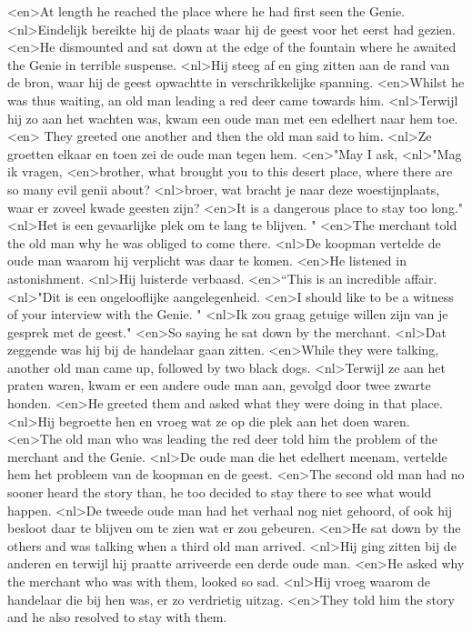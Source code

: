 <en>At length he reached the place where he had first seen the Genie.
<nl>Eindelijk bereikte hij de plaats  waar hij de geest voor het eerst had gezien.
<en>He dismounted and sat down at the edge of the fountain where he awaited the Genie in terrible suspense.
<nl>Hij steeg af en ging zitten aan de rand van de bron, waar hij de geest opwachtte in verschrikkelijke spanning.
<en>Whilst he was thus waiting, an old man leading a red deer came towards him. 
<nl>Terwijl hij zo aan het wachten was, kwam een oude man met een edelhert naar hem toe. 
<en> They greeted one another and then the old man said to him.
<nl>Ze groetten elkaar en toen zei de oude man tegen hem.
<en>"May I ask,
<nl>"Mag ik vragen,
<en>brother, what brought you to this desert place, where there are so many evil genii about?
<nl>broer, wat bracht je naar deze woestijnplaats, waar er zoveel kwade geesten zijn?
<en>It is a dangerous place to stay too long."
<nl>Het is een gevaarlijke plek om te lang te blijven. "
<en>The merchant told the old man why he was obliged to come there.
<nl>De koopman vertelde de oude man waarom hij verplicht was daar te komen.
<en>He listened in astonishment.
<nl>Hij luisterde verbaasd.
<en>“This is an incredible affair.
<nl>"Dit is een ongelooflijke aangelegenheid.
<en>I should like to be a witness of your interview with the Genie. "
<nl>Ik zou graag  getuige willen zijn van je gesprek met de geest."
<en>So saying he sat down by the merchant.
<nl>Dat zeggende was hij bij de handelaar gaan zitten.
<en>While they were talking, another old man came up, followed by two black dogs.
<nl>Terwijl ze aan het praten waren, kwam er een andere oude man aan, gevolgd door twee zwarte honden.
<en>He greeted them and asked what they were doing in that place.
<nl>Hij begroette hen en vroeg wat ze op die plek aan het doen waren.
<en>The old man who was leading the red deer told him the problem of the merchant and the Genie.
<nl>De oude man die het edelhert meenam, vertelde hem het probleem van de koopman en de geest.
<en>The second old man had no sooner heard the story than, he too decided to stay there to see what would happen.
<nl>De tweede oude man had het verhaal nog niet gehoord, of ook hij besloot daar te blijven om te zien wat er zou gebeuren.
<en>He sat down by the others and was talking when a third old man arrived.
<nl>Hij ging zitten bij de anderen en terwijl hij praatte arriveerde  een derde oude man.
<en>He asked why the merchant who was with them, looked so sad.
<nl>Hij vroeg waarom de handelaar die bij hen was, er zo verdrietig uitzag.
<en>They told him the story and he also resolved to stay with them.
